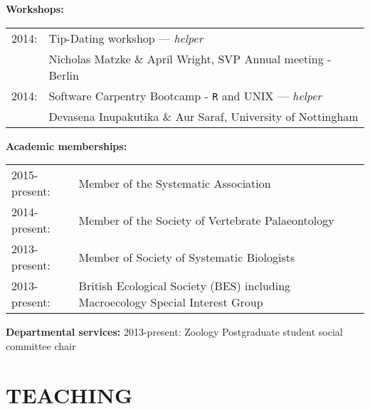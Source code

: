 \documentclass[10pt,a4paper]{article}
\begin{document}
{\raggedright\textbf{Workshops:}

\begin{tabular}{ll}
2014: & Tip-Dating workshop --- \textit{helper}\\
& Nicholas Matzke \& April Wright, SVP Annual meeting - Berlin\\
2014: & Software Carpentry Bootcamp - \texttt{R} and UNIX --- \textit{helper}\\
& Devasena Inupakutika \& Aur Saraf, University of Nottingham\\
\end{tabular}

\bigskip

\raggedright\textbf{Academic memberships:}
\begin{tabular}{ll}
2015-present: & Member of the Systematic Association\\ 
2014-present: & Member of the Society of Vertebrate Palaeontology\\
2013-present: & Member of Society of Systematic Biologists\\
2013-present: & British Ecological Society (BES) including Macroecology Special Interest Group\\
\end{tabular}
\bigskip

\raggedright\textbf{Departmental services:}
2013-present: Zoology Postgraduate student social committee chair
\bigskip


\section{TEACHING}
\bigskip

}
\end{document}
